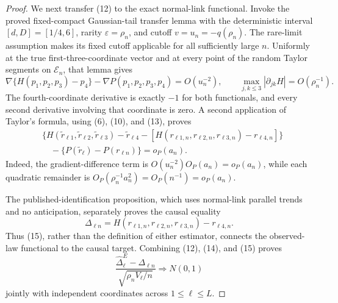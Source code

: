 \documentclass{article}
\begin{document}
\begin{proof}
We next transfer (12) to the exact normal-link functional. Invoke the proved fixed-compact Gaussian-tail transfer lemma with the deterministic interval \([d,D]=[1/4,6]\), rarity \(\varepsilon=\rho_n\), and cutoff \(v=u_n=-q(\rho_n)\). The rare-limit assumption makes its fixed cutoff applicable for all sufficiently large \(n\). Uniformly at the true first-three-coordinate vector and at every point of the random Taylor segments on \(\mathcal E_n\), that lemma gives
\[
 \nabla\{H(p_1,p_2,p_3)-p_4\}-\nabla P(p_1,p_2,p_3,p_4)
 =O(u_n^{-2}),
 \qquad
 \max_{j,k\leq3}|\partial_{jk}H|=O(\rho_n^{-1}).
\tag{13}
\]
The fourth-coordinate derivative is exactly \(-1\) for both functionals, and every second derivative involving that coordinate is zero. A second application of Taylor's formula, using (6), (10), and (13), proves
\[
 \begin{aligned}
 &\{H(\widetilde r_{\ell1},\widetilde r_{\ell2},\widetilde r_{\ell3})
 -\widetilde r_{\ell4}-[H(r_{\ell1,n},r_{\ell2,n},r_{\ell3,n})-r_{\ell4,n}]\}\\
 &\quad-\{P(\widetilde r_\ell)-P(r_{\ell n})\}=o_P(a_n).
 \end{aligned}
\tag{14}
\]
Indeed, the gradient-difference term is \(O(u_n^{-2})O_P(a_n)=o_P(a_n)\), while each quadratic remainder is \(O_P(\rho_n^{-1}a_n^2)=O_P(n^{-1})=o_P(a_n)\).

The published-identification proposition, which uses normal-link parallel trends and no anticipation, separately proves the causal equality
\[
 \Delta_{\ell n}=H(r_{\ell1,n},r_{\ell2,n},r_{\ell3,n})-r_{\ell4,n}.
\tag{15}
\]
Thus (15), rather than the definition of either estimator, connects the observed-law functional to the causal target. Combining (12), (14), and (15) proves
\[
 \frac{\widehat\Delta^E_\ell-\Delta_{\ell n}}
 {\sqrt{\rho_nV_\ell/n}}\Rightarrow N(0,1)
\tag{16}
\]
jointly with independent coordinates across \(1\leq\ell\leq L\).


\end{proof}
\end{document}
